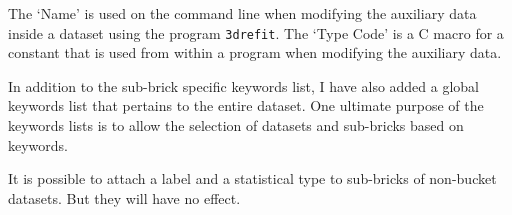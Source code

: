 \begin{description}
         The `Name' is used on the command line when modifying the auxiliary data
         inside a dataset using the program {\tt 3drefit}.  The `Type Code' is a C macro
         for a constant that is used from within a program when modifying the
         auxiliary data.

\end{description}

In addition to the sub-brick specific keywords list, I have also added a global
keywords list that pertains to the entire dataset.  One ultimate purpose of
the keywords lists is to allow the selection of datasets and sub-bricks based
on keywords.

It is possible to attach a label and a statistical type to sub-bricks
of non-bucket datasets.  But they will have no effect.

